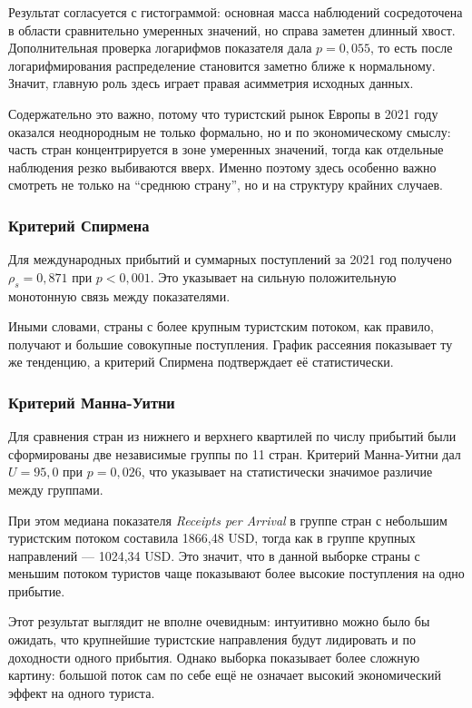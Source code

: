 \documentclass[14pt,a4paper]{extarticle}
\begin{document}
Результат согласуется с гистограммой: основная масса наблюдений сосредоточена в области сравнительно умеренных значений, но справа заметен длинный хвост. Дополнительная проверка логарифмов показателя дала $p=0{,}055$, то есть после логарифмирования распределение становится заметно ближе к нормальному. Значит, главную роль здесь играет правая асимметрия исходных данных.

Содержательно это важно, потому что туристский рынок Европы в 2021 году оказался неоднородным не только формально, но и по экономическому смыслу: часть стран концентрируется в зоне умеренных значений, тогда как отдельные наблюдения резко выбиваются вверх. Именно поэтому здесь особенно важно смотреть не только на ``среднюю страну'', но и на структуру крайних случаев.

\subsubsection{Критерий Спирмена}
Для международных прибытий и суммарных поступлений за 2021 год получено $\rho_s=0{,}871$ при $p<0{,}001$. Это указывает на сильную положительную монотонную связь между показателями.

Иными словами, страны с более крупным туристским потоком, как правило, получают и большие совокупные поступления. График рассеяния показывает ту же тенденцию, а критерий Спирмена подтверждает её статистически.

\subsubsection{Критерий Манна-Уитни}
Для сравнения стран из нижнего и верхнего квартилей по числу прибытий были сформированы две независимые группы по 11 стран. Критерий Манна-Уитни дал $U=95{,}0$ при $p=0{,}026$, что указывает на статистически значимое различие между группами.

При этом медиана показателя \textit{Receipts per Arrival} в группе стран с небольшим туристским потоком составила 1866,48 USD, тогда как в группе крупных направлений — 1024,34 USD. Это значит, что в данной выборке страны с меньшим потоком туристов чаще показывают более высокие поступления на одно прибытие.

Этот результат выглядит не вполне очевидным: интуитивно можно было бы ожидать, что крупнейшие туристские направления будут лидировать и по доходности одного прибытия. Однако выборка показывает более сложную картину: большой поток сам по себе ещё не означает высокий экономический эффект на одного туриста.
\end{document}
